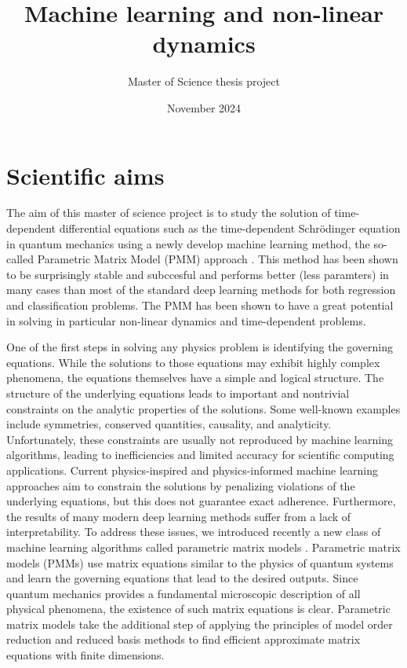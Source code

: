 \documentclass{article}
\title{Machine learning and non-linear dynamics}
\author{Master of Science thesis project}
\date{November 2024}
\begin{document}
\maketitle  

\section{Scientific aims}


The aim of this master of science project is to study the solution of
time-dependent differential equations such as the time-dependent
Schr\"odinger equation in quantum mechanics using a newly develop
machine learning method, the so-called Parametric Matrix Model (PMM)
approach \cite{us2024}. This method has been shown to be surprisingly
stable and subccesful and performs better (less paramters) in many
cases than most of the standard deep learning methods for both
regression and classification problems.  The PMM has been shown to
have a great potential in solving in particular non-linear dynamics
and time-dependent problems.


One of the first steps in solving any physics problem is identifying
the governing equations.  While the solutions to those equations may
exhibit highly complex phenomena, the equations themselves have a
simple and logical structure.  The structure of the underlying
equations leads to important and nontrivial constraints on the
analytic properties of the solutions.  Some well-known examples
include symmetries, conserved quantities, causality, and analyticity.
Unfortunately, these constraints are usually not reproduced by machine
learning algorithms, leading to inefficiencies and limited accuracy
for scientific computing applications. Current physics-inspired and
physics-informed machine learning approaches aim to constrain the
solutions by penalizing violations of the underlying equations, but
this does not guarantee exact adherence.  Furthermore, the results of
many modern deep learning methods suffer from a lack of
interpretability.  To address these issues, we introduced recently a
new class of machine learning algorithms called parametric matrix
models \cite{us2024}.  Parametric matrix models (PMMs) use matrix
equations similar to the physics of quantum systems and learn the
governing equations that lead to the desired outputs.  Since quantum
mechanics provides a fundamental microscopic description of all
physical phenomena, the existence of such matrix equations is clear.
Parametric matrix models take the additional step of applying the
principles of model order reduction and reduced basis methods to find
efficient approximate matrix equations with finite dimensions.
\end{document}
